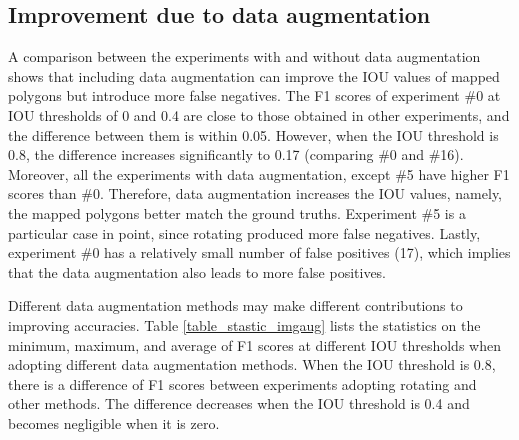\documentclass[authoryear,preprint,review,12pt]{elsarticle}
\begin{document}
\subsection{Improvement due to data augmentation}
\label{subsec_contrib_dataAug}

A comparison between the experiments with and without data augmentation shows that including data augmentation can improve the IOU values of mapped polygons but introduce more false negatives. The F1 scores of experiment \#0 at IOU thresholds of 0 and 0.4 are close to those obtained in other experiments, and the difference between them is within 0.05. 
However, when the IOU threshold is 0.8, the difference increases significantly to 0.17 (comparing \#0 and \#16). Moreover, all the experiments with data augmentation, except \#5 have higher F1 scores than \#0. Therefore, data augmentation increases the IOU values, namely, the mapped polygons better match the ground truths. Experiment \#5 is a particular case in point, since rotating produced more false negatives. 
Lastly, experiment \#0 has a relatively small number of false positives (17), which implies that the data augmentation also leads to more false positives. 


Different data augmentation methods may make different contributions to improving accuracies. Table \ref{table_stastic_imgaug} lists the statistics on the minimum, maximum, and average of F1 scores at different IOU thresholds when adopting different data augmentation methods. 
When the IOU threshold is 0.8, there is a difference of F1 scores between experiments adopting rotating and other methods. The difference decreases when the IOU threshold is 0.4 and becomes negligible when it is zero. 
\end{document}
